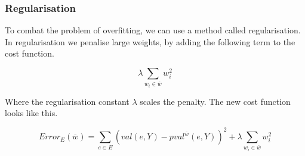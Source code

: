 \subsubsection{Regularisation}\label{sec:regular}
To combat the problem of overfitting, we can use a method called regularisation.
In regularisation we penalise large weights, by adding the following term to the cost function.


\[ \lambda \sum_{w_i \in \overline{w}} w_i^2 \]

Where the regularisation constant $\lambda$ scales the penalty. 
The new cost function looks like this.

\[ Error_E(\overline{w}) = \sum_{e \in E} \left(val(e,Y) - pval^{\overline{w}}(e,Y)\right)^2 + \lambda \sum_{w_i \in \overline{w}} w_i^2 \]


\begin{flushright}
\cite[online course]{courseraAI}
\end{flushright}














